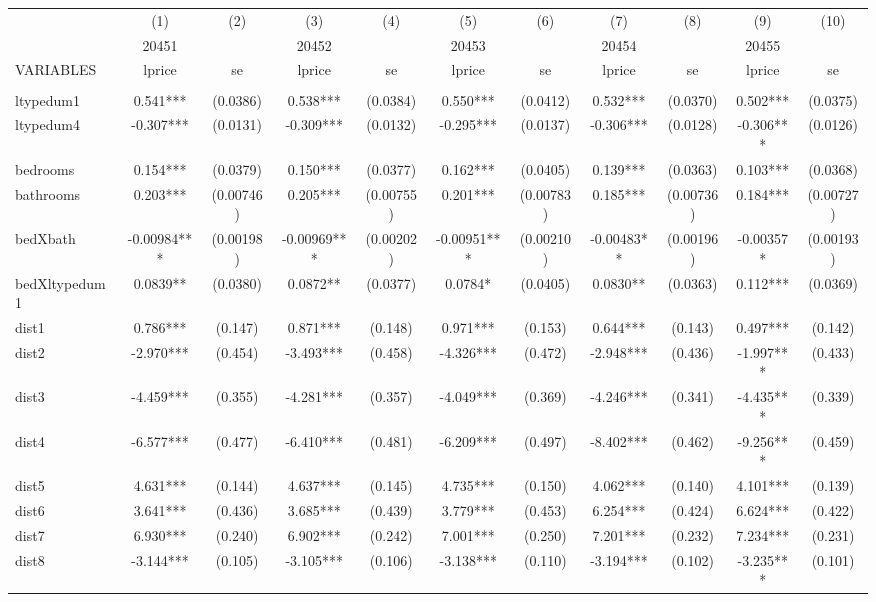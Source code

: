 \documentclass[]{article}
\begin{document}
\begin{tabular}{lcccccccccc} \hline
 & (1) & (2) & (3) & (4) & (5) & (6) & (7) & (8) & (9) & (10) \\
 & 20451 &  & 20452 &  & 20453 &  & 20454 &  & 20455 &  \\
VARIABLES & lprice & se & lprice & se & lprice & se & lprice & se & lprice & se \\ \hline
 &  &  &  &  &  &  &  &  &  &  \\
ltypedum1 & 0.541*** & (0.0386) & 0.538*** & (0.0384) & 0.550*** & (0.0412) & 0.532*** & (0.0370) & 0.502*** & (0.0375) \\
ltypedum4 & -0.307*** & (0.0131) & -0.309*** & (0.0132) & -0.295*** & (0.0137) & -0.306*** & (0.0128) & -0.306*** & (0.0126) \\
bedrooms & 0.154*** & (0.0379) & 0.150*** & (0.0377) & 0.162*** & (0.0405) & 0.139*** & (0.0363) & 0.103*** & (0.0368) \\
bathrooms & 0.203*** & (0.00746) & 0.205*** & (0.00755) & 0.201*** & (0.00783) & 0.185*** & (0.00736) & 0.184*** & (0.00727) \\
bedXbath & -0.00984*** & (0.00198) & -0.00969*** & (0.00202) & -0.00951*** & (0.00210) & -0.00483** & (0.00196) & -0.00357* & (0.00193) \\
bedXltypedum1 & 0.0839** & (0.0380) & 0.0872** & (0.0377) & 0.0784* & (0.0405) & 0.0830** & (0.0363) & 0.112*** & (0.0369) \\
dist1 & 0.786*** & (0.147) & 0.871*** & (0.148) & 0.971*** & (0.153) & 0.644*** & (0.143) & 0.497*** & (0.142) \\
dist2 & -2.970*** & (0.454) & -3.493*** & (0.458) & -4.326*** & (0.472) & -2.948*** & (0.436) & -1.997*** & (0.433) \\
dist3 & -4.459*** & (0.355) & -4.281*** & (0.357) & -4.049*** & (0.369) & -4.246*** & (0.341) & -4.435*** & (0.339) \\
dist4 & -6.577*** & (0.477) & -6.410*** & (0.481) & -6.209*** & (0.497) & -8.402*** & (0.462) & -9.256*** & (0.459) \\
dist5 & 4.631*** & (0.144) & 4.637*** & (0.145) & 4.735*** & (0.150) & 4.062*** & (0.140) & 4.101*** & (0.139) \\
dist6 & 3.641*** & (0.436) & 3.685*** & (0.439) & 3.779*** & (0.453) & 6.254*** & (0.424) & 6.624*** & (0.422) \\
dist7 & 6.930*** & (0.240) & 6.902*** & (0.242) & 7.001*** & (0.250) & 7.201*** & (0.232) & 7.234*** & (0.231) \\
dist8 & -3.144*** & (0.105) & -3.105*** & (0.106) & -3.138*** & (0.110) & -3.194*** & (0.102) & -3.235*** & (0.101) \\

\end{tabular}
\end{document}
